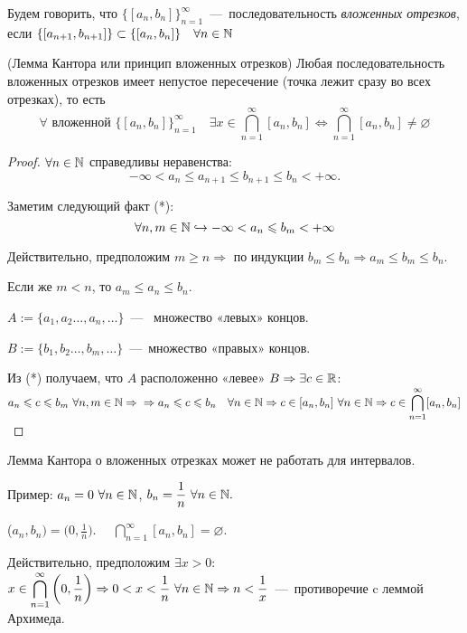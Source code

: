     \begin{definition}
        Будем говорить, что $\{ [a_{n}, b_{n}] \}^{\infty}_{n = 1}$~---~последовательность \textit{вложенных отрезков}, если $\{ [a_{n+1}, b_{n+1}] \} \subset \{ [a_{n}, b_{n}] \} \quad \forall n \in \mathbb{N}$
    \end{definition}
    \begin{lemma}
        (Лемма Кантора или принцип вложенных отрезков) Любая последовательность вложенных отрезков имеет непустое пересечение (точка лежит сразу во всех отрезках), то есть
        $$\forall \text{ вложенной } \{ [a_{n}, b_{n}] \}^{\infty}_{n = 1} \quad \exists x \in \bigcap_{n = 1}^{\infty} [a_{n}, b_{n}] \Longleftrightarrow \bigcap_{n = 1}^{\infty} [a_{n}, b_{n}] \neq \varnothing$$
    \end{lemma}
    \begin{proof}
        $\forall n \in \mathbb{N}$ справедливы неравенства:
        $$-\infty < a_{n} \leq a_{n+1} \leq b_{n+1} \leq b_{n} < +\infty.$$

        Заметим следующий факт (*):
        $$ \forall n, m \in \mathbb{N} \hookrightarrow -\infty < a_{n} \leqslant b_{m} < +\infty$$

        Действительно, предположим $m \geq n \Rightarrow$ по индукции $b_{m} \leq b_{n} \Rightarrow a_{m} \leq b_{m} \leq b_{n}.$
        
        Если же $m < n$, то $a_{m} \leq a_{n} \leq b_{n}.$

        $A := \{a_{1}, a_{2} \dots , a_{n}, \dots \}$~---~ множество «левых» концов.
        
        $B := \{b_{1}, b_{2} \dots , b_{m}, \dots \}$~---~множество «правых» концов.

        Из (*) получаем, что $A$ расположенно «левее» $B \Rightarrow \exists c \in \mathbb{R}$: $a_{n} \leq c \leq b_{m} \  \forall n, m \in \N \Rightarrow \newline \Rightarrow a_{n} \leq c \leq b_{n} \quad \forall n \in \N \Rightarrow c \in [a_{n}, b_{n}] \  \forall n \in \N \Rightarrow c \in \displaystyle \bigcap_{n = 1}^{\infty} [a_{n}, b_{n}]$
    \end{proof}
    \begin{note}
        Лемма Кантора о вложенных отрезках может не работать для интервалов.

        Пример: $\displaystyle a_{n} = 0 \  \forall n \in \mathbb{N}$, $\displaystyle b_{n} = \frac{1}{n} \  \forall n \in \mathbb{N}.$

        ($\displaystyle a_{n}, b_{n}) = \Big(0, \frac{1}{n} \Big).$ $\quad \displaystyle \bigcap_{n = 1}^{\infty} [a_{n}, b_{n}] = \varnothing.$

        Действительно, предположим $\displaystyle \exists x > 0$: $\displaystyle x \in \bigcap_{n = 1}^{\infty} \bigg( 0, \frac{1}{n} \bigg) \Rightarrow 0 < x < \frac{1}{n} \  \forall n \in \mathbb{N} \Rightarrow n < \frac{1}{x}$~---~противоречие c леммой Архимеда.
    \end{note}
